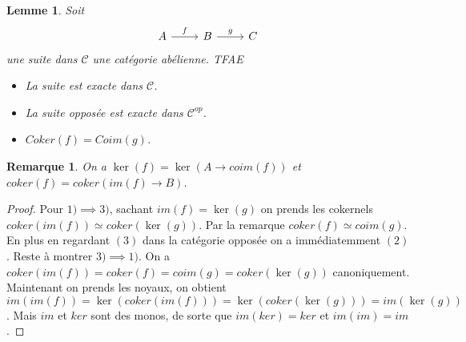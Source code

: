 \documentclass[a4paper,12pt]{book}
\newcommand{\Cat}{\mathcal{C}}
\theoremstyle{plain}
\newtheorem{lem}[subsection]{Lemme}
\newtheorem{rem}{Remarque}
\theoremstyle{definition}
\theoremstyle{remark}
\begin{document}
\begin{lem}
    Soit
\[\begin{tikzcd}
	A & B & C
	\arrow["f", from=1-1, to=1-2]
	\arrow["g", from=1-2, to=1-3]
\end{tikzcd}\]
une suite dans $\Cat$ une catégorie abélienne. TFAE
\begin{itemize}
    \item La suite est exacte dans $\Cat$.
    \item La suite opposée est exacte dans $\Cat^{op}$.
    \item $Coker(f)=Coim(g)$.
\end{itemize}
\end{lem}
\begin{rem}
    On a $\ker(f)=\ker(A\to coim(f))$ et $coker(f)=coker(im(f)\to B)$.
\end{rem}
\begin{proof}
    Pour $1)\implies 3)$, sachant $im(f)=\ker(g)$ on prends les 
    cokernels $coker(im(f))\simeq coker(\ker(g))$. Par la remarque
    $coker(f)\simeq coim(g)$. En plus en regardant $(3)$ dans la 
    catégorie opposée on a immédiatemment $(2)$. Reste à montrer
    $3)\implies 1)$. On a $coker(im(f))=coker(f)=coim(g)=coker(\ker(g))$
    canoniquement. Maintenant on prends les noyaux, on obtient 
    $im(im(f))=\ker(coker(im(f)))=\ker(coker(\ker(g)))=im(\ker(g))$. 
    Mais $im$ et $ker$ sont des monos, de sorte que $im(ker)=ker$ et
    $im(im)=im$.
\end{proof}


\printbibliography
\end{document}
